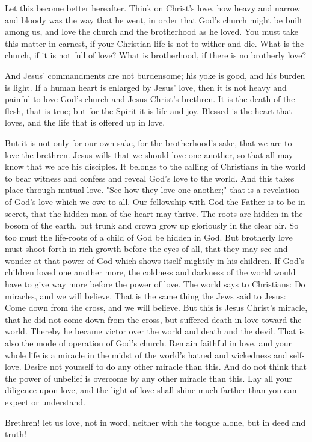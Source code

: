 Let this become better hereafter. Think on Christ’s love, how heavy and narrow and bloody was the way that he went, in order that God’s church might be built among us, and love the church and the brotherhood as he loved. You must take this matter in earnest, if your Christian life is not to wither and die. What is the church, if it is not full of love? What is brotherhood, if there is no brotherly love?

And Jesus’ commandments are not burdensome; his yoke is good, and his burden is light. If a human heart is enlarged by Jesus’ love, then it is not heavy and painful to love God’s church and Jesus Christ’s brethren. It is the death of the flesh, that is true; but for the Spirit it is life and joy. Blessed is the heart that loves, and the life that is offered up in love.

But it is not only for our own sake, for the brotherhood’s sake, that we are to love the brethren. Jesus wills that we should love one another, so that all may know that we are his disciples. It belongs to the calling of Christians in the world to bear witness and confess and reveal God’s love to the world. And this takes place through mutual love. "See how they love one another;" that is a revelation of God’s love which we owe to all. Our fellowship with God the Father is to be in secret, that the hidden man of the heart may thrive. The roots are hidden in the bosom of the earth, but trunk and crown grow up gloriously in the clear air. So too must the life-roots of a child of God be hidden in God. But brotherly love must shoot forth in rich growth before the eyes of all, that they may see and wonder at that power of God which shows itself mightily in his children. If God’s children loved one another more, the coldness and darkness of the world would have to give way more before the power of love. The world says to Christians: Do miracles, and we will believe. That is the same thing the Jews said to Jesus: Come down from the cross, and we will believe. But this is Jesus Christ’s miracle, that he did not come down from the cross, but suffered death in love toward the world. Thereby he became victor over the world and death and the devil. That is also the mode of operation of God’s church. Remain faithful in love, and your whole life is a miracle in the midst of the world’s hatred and wickedness and self-love. Desire not yourself to do any other miracle than this. And do not think that the power of unbelief is overcome by any other miracle than this. Lay all your diligence upon love, and the light of love shall shine much farther than you can expect or understand.

Brethren! let us love, not in word, neither with the tongue alone, but in deed and truth!
